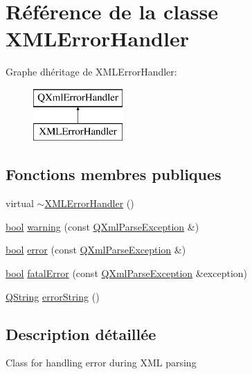 \hypertarget{class_x_m_l_error_handler}{}\section{Référence de la classe X\+M\+L\+Error\+Handler}
\label{class_x_m_l_error_handler}
Graphe d\textquotesingle{}héritage de X\+M\+L\+Error\+Handler\+:\begin{figure}[H]
\begin{center}
\leavevmode
\includegraphics[height=2.000000cm]{class_x_m_l_error_handler}
\end{center}
\end{figure}
\subsection*{Fonctions membres publiques}
\begin{DoxyCompactItemize}
\item 
virtual \hyperlink{class_x_m_l_error_handler_a3d87a2a78c1c4bb25cad5a09b60a314f}{$\sim$\+X\+M\+L\+Error\+Handler} ()
\item 
\hyperlink{qglobal_8h_a1062901a7428fdd9c7f180f5e01ea056}{bool} \hyperlink{class_x_m_l_error_handler_ae24e6692734e1075c74d0417c1678548}{warning} (const \hyperlink{class_q_xml_parse_exception}{Q\+Xml\+Parse\+Exception} \&)
\item 
\hyperlink{qglobal_8h_a1062901a7428fdd9c7f180f5e01ea056}{bool} \hyperlink{class_x_m_l_error_handler_a79615a75d1d5e5bf0c3a1c659a1956b9}{error} (const \hyperlink{class_q_xml_parse_exception}{Q\+Xml\+Parse\+Exception} \&)
\item 
\hyperlink{qglobal_8h_a1062901a7428fdd9c7f180f5e01ea056}{bool} \hyperlink{class_x_m_l_error_handler_a7e3ad0aecf457ca44b284c71c1ab28bc}{fatal\+Error} (const \hyperlink{class_q_xml_parse_exception}{Q\+Xml\+Parse\+Exception} \&exception)
\item 
\hyperlink{class_q_string}{Q\+String} \hyperlink{class_x_m_l_error_handler_ac8884161fa6aa0624f42ec57b04a66bb}{error\+String} ()
\end{DoxyCompactItemize}


\subsection{Description détaillée}
Class for handling error during X\+M\+L parsing 

